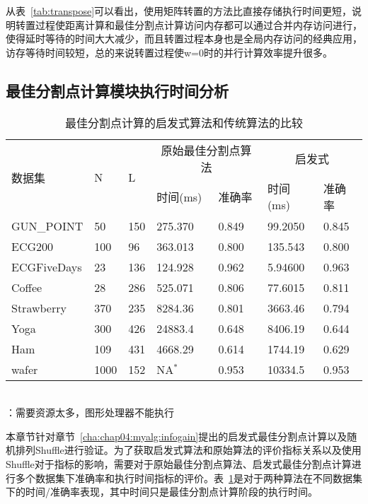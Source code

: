 从表~\ref{tab:transpose}可以看出，使用矩阵转置的方法比直接存储执行时间更短，说明转置过程使距离计算和最佳分割点计算访问内存都可以通过合并内存访问进行，使得延时等待的时间大大减少，而且转置过程本身也是全局内存访问的经典应用，访存等待时间较短，总的来说转置过程使w=0时的并行计算效率提升很多。

\subsection{最佳分割点计算模块执行时间分析}

\begin{table}[htbp]
	\centering
	\begin{minipage}{0.95\textwidth}
		\caption{最佳分割点计算的启发式算法和传统算法的比较}
		\label{tab:ShuffleWork}
		\begin{tabular}{p{2cm}p{1cm}p{1cm}p{2cm}p{2cm}p{1.5cm}p{1.5cm}}
			\toprule[1.5pt]
			\multirow{2}{*}{{\heiti 数据集}} 
			& \multirow{2}{*}{{\heiti N}} 
			& \multirow{2}{*}{{\heiti L}}
			& \multicolumn{2}{c}{{\heiti 原始最佳分割点算法 }} & \multicolumn{2}{c}{{\heiti  启发式 }}  \\ \cmidrule[1.2pt]{4-7}
			&&& 时间(ms)         & 准确率         & 时间(ms)         & 准确率      
			\\\midrule[1pt]
			GUN\_POINT & 50 & 150 & 275.370 & 0.849 & 99.2050 & 0.845\\
			ECG200 &100 &96 & 363.013 & 0.800 & 135.543 & 0.800\\
			ECGFiveDays & 23 & 136 & 124.928 & 0.962 & 5.94600 & 0.963\\
			Coffee & 28 &286 & 525.071 & 0.806 & 77.6015 & 0.811\\
			Strawberry &370  & 235& 8284.36 & 0.801 & 3663.46 & 0.794\\
			Yoga & 300 & 426 & 24883.4 & 0.648 & 8406.19 & 0.644\\
			Ham &109 &431& 4668.29 & 0.614 & 1744.19 & 0.629\\
			wafer &1000 &152 & NA$^*$ & 0.953 & 10334.5 & 0.953\\
			\bottomrule[1.5pt]
		\end{tabular}\\
		\footnotesize *：需要资源太多，图形处理器不能执行 \\
	\end{minipage}
\end{table}

本章节针对章节~\ref{cha:chap04:myalg:infogain}提出的启发式最佳分割点计算以及随机排列Shuffle进行验证。为了获取启发式算法和原始算法的评价指标关系以及使用Shuffle对于指标的影响，需要对于原始最佳分割点算法、启发式最佳分割点计算进行多个数据集下准确率和执行时间指标的评价。表~\ref{tab:ShuffleWork}是对于两种算法在不同数据集下的时间/准确率表现，其中时间只是最佳分割点计算阶段的执行时间。

